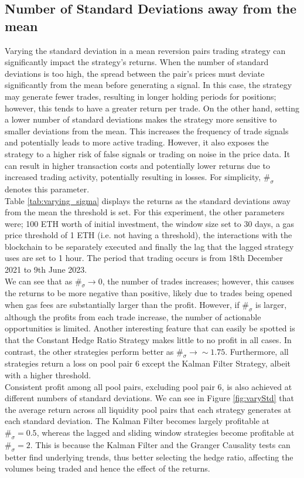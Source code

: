 \subsection{Number of Standard Deviations away from the mean}
Varying the standard deviation in a mean reversion pairs trading strategy can significantly impact the strategy's returns. When the number of standard deviations is too high, the spread between the pair's prices must deviate significantly from the mean before generating a signal. In this case, the strategy may generate fewer trades, resulting in longer holding periods for positions; however, this tends to have a greater return per trade. On the other hand, setting a lower number of standard deviations makes the strategy more sensitive to smaller deviations from the mean. This increases the frequency of trade signals and potentially leads to more active trading. However, it also exposes the strategy to a higher risk of false signals or trading on noise in the price data. It can result in higher transaction costs and potentially lower returns due to increased trading activity, potentially resulting in losses. For simplicity, $\#_{\sigma}$ denotes this parameter.
\\[3mm]
Table \ref{tab:varying_sigma} displays the returns as the standard deviations away from the mean the threshold is set. For this experiment, the other parameters were; 100 ETH worth of initial investment, the window size set to 30 days, a gas price threshold of 1 ETH (i.e. not having a threshold), the interactions with the blockchain to be separately executed and finally the lag that the lagged strategy uses are set to 1 hour. The period that trading occurs is from 18th December 2021 to 9th June 2023.
\\[3mm]
We can see that as $\#_{\sigma} \rightarrow 0$, the number of trades increases; however, this causes the returns to be more negative than positive, likely due to trades being opened when gas fees are substantially larger than the profit. However, if $\#_{\sigma}$ is larger, although the profits from each trade increase, the number of actionable opportunities is limited. Another interesting feature that can easily be spotted is that the Constant Hedge Ratio Strategy makes little to no profit in all cases. In contrast, the other strategies perform better as $\#_{\sigma} \rightarrow \sim 1.75$. Furthermore, all strategies return a loss on pool pair 6 except the Kalman Filter Strategy, albeit with a higher threshold.
\\[3mm]
Consistent profit among all pool pairs, excluding pool pair 6, is also achieved at different numbers of standard deviations. We can see in Figure \ref{fig:varyStd} that the average return across all liquidity pool pairs that each strategy generates at each standard deviation. The Kalman Filter becomes largely profitable at $\#_{\sigma} = 0.5$, whereas the lagged and sliding window strategies become profitable at $\#_{\sigma} = 2$. This is because the Kalman Filter and the Granger Causality tests can better find underlying trends, thus better selecting the hedge ratio, affecting the volumes being traded and hence the effect of the returns.

